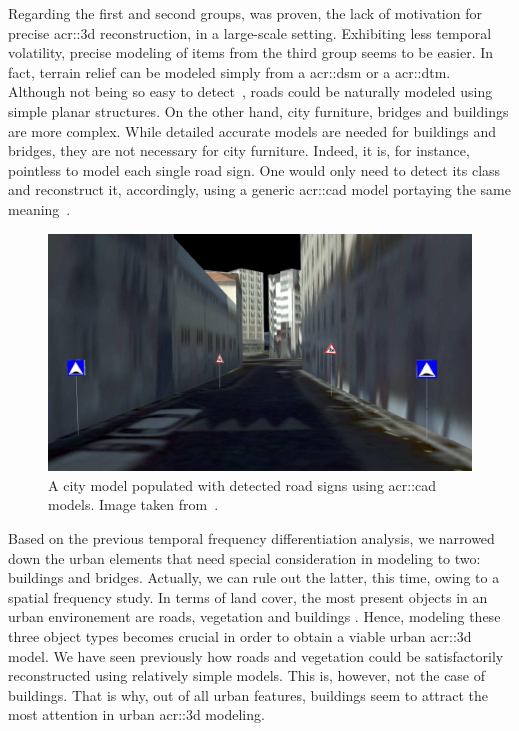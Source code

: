             Regarding the first and second groups, was proven, the lack of motivation for precise \gls{acr::3d} reconstruction, in a large-scale setting.
            Exhibiting less temporal volatility, precise modeling of items from the third group seems to be easier.
            In fact, terrain relief can be modeled simply from a \gls{acr::dsm} or a \gls{acr::dtm}.
            Although not being so easy to detect~\parencite{mnih2010learning}, roads could be naturally modeled using simple planar structures.
            On the other hand, city furniture, bridges and buildings are more complex.
            While detailed accurate models are needed for buildings and bridges, they are not necessary for city furniture.
            Indeed, it is, for instance, pointless to model each single road sign.
            One would only need to detect its class and reconstruct it, accordingly, using a generic \gls{acr::cad} model portaying the same meaning~\parencite{soheilian2013detection}.\\
            \begin{figure}[htpb]
                \centering
                \includegraphics[width=\textwidth]{images/introduction/modeling_road_signs}
                \caption[
                    A city model populated with detected road signs using \acrshort*{acr::cad} models.
                ]{
                    \label{fig::3d_road_signs_models}
                    A city model populated with detected road signs using \gls{acr::cad} models.
                    Image taken from~\parencite{soheilian2013detection}.
                }
            \end{figure}

            Based on the previous temporal frequency differentiation analysis, we narrowed down the urban elements that need special consideration in modeling to two: buildings and bridges. 
            Actually, we can rule out the latter, this time, owing to a spatial frequency study.
            In terms of land cover, the most present objects in an urban environement are roads, vegetation and buildings \addref.
            Hence, modeling these three object types becomes crucial in order to obtain a viable urban \gls{acr::3d} model.
            We have seen previously how roads and vegetation could be satisfactorily reconstructed using relatively simple models.
            This is, however, not the case of buildings.
            That is why, out of all urban features, buildings seem to attract the most attention in urban \gls{acr::3d} modeling.

